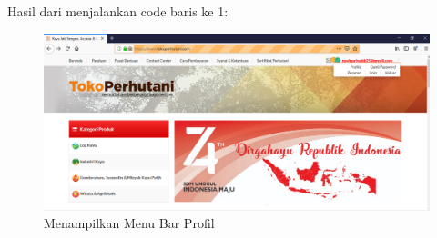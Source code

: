 Hasil dari menjalankan code baris ke 1:
\begin{figure}[h]
	\centering
	\includegraphics[scale=0.25]{figures/caripropil}
	\caption{Menampilkan Menu Bar Profil}
\end{figure}

